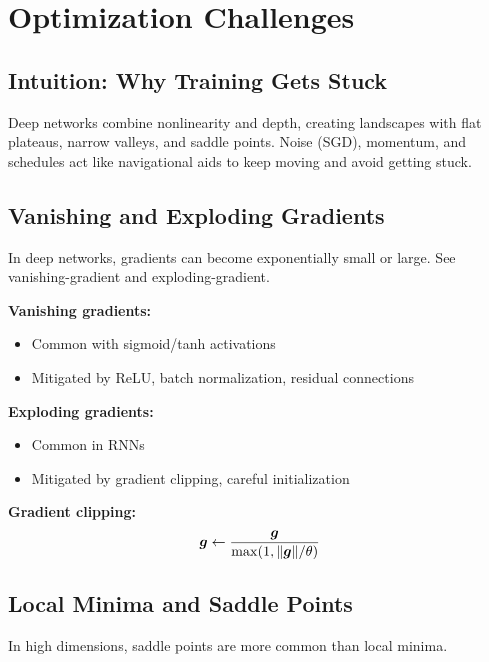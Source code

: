 
\section{Optimization Challenges}
\label{sec:challenges}

\subsection{Intuition: Why Training Gets Stuck}

Deep networks combine nonlinearity and depth, creating landscapes with flat plateaus, narrow valleys, and saddle points. Noise (SGD), momentum, and schedules act like navigational aids to keep moving and avoid getting stuck.

\subsection{Vanishing and Exploding Gradients}

In deep networks, gradients can become exponentially small or large. See \gls{vanishing-gradient} and \gls{exploding-gradient}.

\textbf{Vanishing gradients:}
\begin{itemize}
    \item Common with sigmoid/tanh activations
    \item Mitigated by ReLU, batch normalization, residual connections
\end{itemize}

\textbf{Exploding gradients:}
\begin{itemize}
    \item Common in RNNs
    \item Mitigated by gradient clipping, careful initialization
\end{itemize}

\textbf{Gradient clipping:}
\begin{equation}
\boldsymbol{g} \leftarrow \frac{\boldsymbol{g}}{\max(1, \|\boldsymbol{g}\| / \theta)}
\end{equation}

\subsection{Local Minima and Saddle Points}

In high dimensions, saddle points are more common than local minima.


